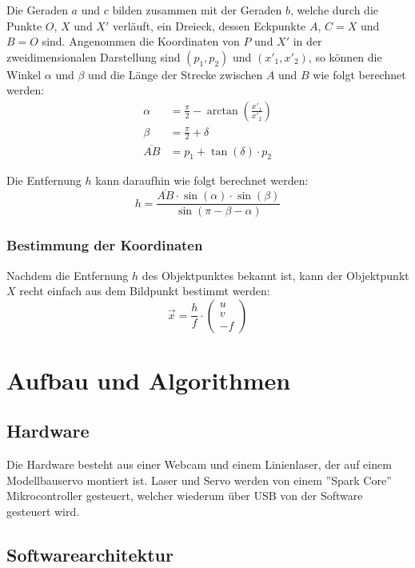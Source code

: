 \documentclass[ngerman,a4paper,parskip=half]{scrartcl}
\begin{document}
Die Geraden $a$ und $c$ bilden zusammen mit der Geraden $b$, welche durch die Punkte $O$, $X$ und $X'$ verläuft, ein Dreieck, dessen Eckpunkte $A$, $C = X$ und $B = O$ sind. Angenommen die Koordinaten von $P$ und $X'$ in der zweidimensionalen Darstellung sind $(p_1,p_2)$ und $(x'_1, x'_2)$, so können die Winkel $\alpha$ und $\beta$ und die Länge der Strecke zwischen $A$ und $B$ wie folgt berechnet werden:
\begin{align*}
	\alpha &= \frac{\pi}{2} - \arctan\left(\frac{x'_1}{x'_2}\right)\\
	\beta &= \frac{\pi}{2} + \delta\\
	\overline{AB} &= p_1 + \tan(\delta) \cdot p_2
\end{align*}

Die Entfernung $h$ kann daraufhin wie folgt berechnet werden:
\[ h = \frac{\overline{AB} \cdot \sin(\alpha) \cdot \sin(\beta)}{\sin(\pi - \beta - \alpha)} \]

\subsubsection{Bestimmung der Koordinaten}

Nachdem die Entfernung $h$ des Objektpunktes bekannt ist, kann der Objektpunkt $X$ recht einfach aus dem Bildpunkt bestimmt werden:
\[ \vec{x} = \frac{h}{f} \cdot \begin{pmatrix}
u \\ v \\ -f
\end{pmatrix} \]


\section{Aufbau und Algorithmen}

\subsection{Hardware}

Die Hardware besteht aus einer Webcam und einem Linienlaser, der auf einem Modellbauservo montiert ist. Laser und Servo werden von einem ''Spark Core'' Mikrocontroller gesteuert, welcher wiederum über USB von der Software gesteuert wird.

\subsection{Softwarearchitektur}
\end{document}
